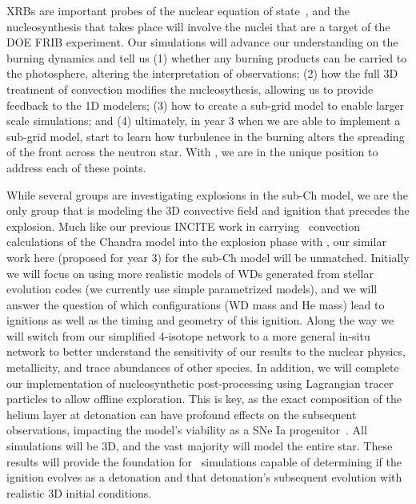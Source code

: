 \documentclass[11pt,letterpaper,english]{article}
\begin{document}
XRBs are important probes of the nuclear equation of
state~\cite{ozel:2010,steiner:2010}, and the nucleosynthesis that
takes place will involve the nuclei that are a target of the DOE FRIB
experiment.  Our simulations will advance our understanding on the
burning dynamics and tell us (1) whether any burning products can be
carried to the photosphere, altering the interpretation of
observations; (2) how the full 3D treatment of convection modifies the
nucleosythesis, allowing us to provide feedback to the 1D modelers;
(3) how to create a sub-grid model to enable larger scale simulations;
and (4) ultimately, in year 3 when we are able to implement a sub-grid
model, start to learn how turbulence in the burning alters the
spreading of the front across the neutron star.  With \maestro, we are
in the unique position to address each of these points.

While several groups are investigating explosions in the sub-Ch model,
we are the only group that is modeling the 3D convective field and
ignition that precedes the explosion.  Much like our previous INCITE
work in carrying \maestro\ convection calculations of the Chandra
model into the explosion phase with \castro, our similar work here
(proposed for year 3) for the sub-Ch model will be unmatched.
Initially we will focus on using more realistic models of WDs
generated from stellar evolution codes (we currently use simple
parametrized models), and we will answer the question of which
configurations (WD mass and He mass) lead to ignitions as well as the
timing and geometry of this ignition.  Along the way we will switch
from our simplified 4-isotope network to a more general in-situ
network to better understand the sensitivity of our results to the
nuclear physics, metallicity, and trace abundances of other species.
In addition, we will complete our implementation of nucleosynthetic
post-processing using Lagrangian tracer particles to allow offline
exploration.  This is key, as the exact composition of the helium
layer at detonation can have profound effects on the subsequent
observations, impacting the model's viability as a SNe Ia
progenitor~\cite{kromer:2010}.  All simulations will be 3D, and the
vast majority will model the entire star.  These results will provide
the foundation for \castro\ simulations capable of determining if the
ignition evolves as a detonation and that detonation's subsequent
evolution with realistic 3D initial conditions.
 
\end{document}
